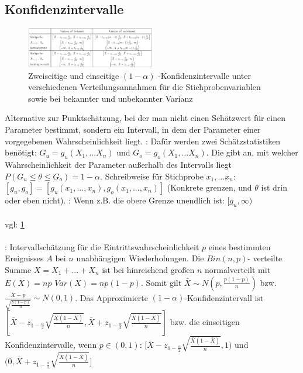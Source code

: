 \subsection{Konfidenzintervalle}
\begin{figure}
    \vspace{-5mm}
    \centering
    \includegraphics[width=0.5\textwidth]{images/tab9.1_konfidenzintervalle.png}
    \caption{Zweiseitige und einseitige $(1 - \alpha)$ -Konfidenzintervalle unter verschiedenen Verteilungsannahmen für
    die Stichprobenvariablen sowie bei bekannter und unbekannter Varianz}
    \vspace{-10mm}
    \label{fig:konfi}
\end{figure}
Alternative zur Punktschätzung, bei der man nicht einen Schätzwert für einen Parameter bestimmt, sondern ein Intervall, in dem der Parameter einer vorgegebenen Wahrscheinlichkeit liegt.
: Dafür werden zwei Schätzstatistiken benötigt: $G_u = g_u(X_1, ... X_n)$ und $G_o = g_o(X_1, ... X_n)$.
Die  gibt an, mit welcher Wahrscheinlichkeit der Parameter außerhalb des Intervalls liegt $P(G_u \le \theta \le G_o) = 1 - \alpha$. Schreibweise für Stichprobe $x_1, ... x_n$: $[g_u, g_o] = [g_u(x_1, ..., x_n), g_o(x_1, ..., x_n)]$ (Konkrete grenzen, und $\theta$ ist drin oder eben nicht). : Wenn z.B. die obere Grenze unendlich ist: $[g_u, \infty)$\\\\
 vgl: \cref{fig:konfi} \\\\
: Intervallschätzung für die Eintrittswahrscheinlichkeit $p$ eines bestimmten Ereignisses $A$ bei $n$ unabhängigen Wiederholungen.
Die $Bin(n,p)$- verteilte Summe $X = X_1 + ... + X_n$ ist bei hinreichend großen $n$ normalverteilt mit $E(X) = np$ $Var(X) = np(1-p)$. Somit gilt $\bar{X} \sim N(p, \frac{p(1-p)}{n})$ bzw. $\frac{\bar{X} - p}{\sqrt{\frac{p(1-p)}{n}}}\sim N(0,1)$. 
Das Approximierte $(1 - \alpha)$-Konfidenzintervall ist $[\bar{X} - z_{1 - \frac{\alpha}{2}}\sqrt{\frac{\bar{X}(1-\bar{X})}{n}}, \bar{X} + z_{1 - \frac{\alpha}{2}}\sqrt{\frac{\bar{X}(1-\bar{X})}{n}}]$ bzw. die einseitigen Konfidenzintervalle, wenn $p \in (0, 1)$: $[\bar{X} - z_{1 - \frac{\alpha}{2}}\sqrt{\frac{\bar{X}(1-\bar{X})}{n}}, 1)$ und $(0, \bar{X} + z_{1 - \frac{\alpha}{2}}\sqrt{\frac{\bar{X}(1-\bar{X})}{n}}]$

